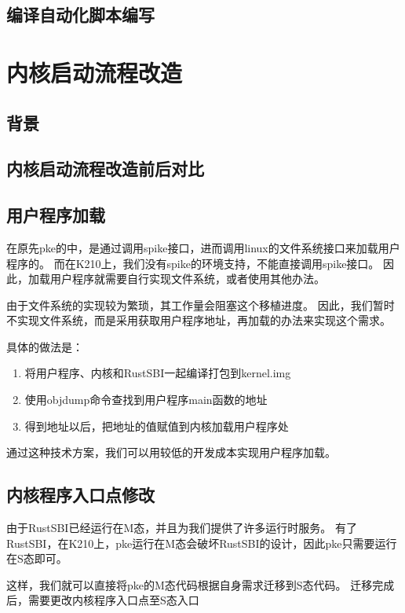 \subsection{编译自动化脚本编写}

\section{内核启动流程改造}

\subsection{背景}

\subsection{内核启动流程改造前后对比}

\subsection{用户程序加载}

在原先pke的中，是通过调用spike接口，进而调用linux的文件系统接口来加载用户程序的。
而在K210上，我们没有spike的环境支持，不能直接调用spike接口。
因此，加载用户程序就需要自行实现文件系统，或者使用其他办法。

由于文件系统的实现较为繁琐，其工作量会阻塞这个移植进度。
因此，我们暂时不实现文件系统，而是采用获取用户程序地址，再加载的办法来实现这个需求。

具体的做法是：

\begin{enumerate}
    \item 将用户程序、内核和RustSBI一起编译打包到kernel.img
    \item 使用objdump命令查找到用户程序main函数的地址
    \item 得到地址以后，把地址的值赋值到内核加载用户程序处
\end{enumerate}

通过这种技术方案，我们可以用较低的开发成本实现用户程序加载。

\subsection{内核程序入口点修改}

由于RustSBI已经运行在M态，并且为我们提供了许多运行时服务。
有了RustSBI，在K210上，pke运行在M态会破坏RustSBI的设计，因此pke只需要运行在S态即可。

这样，我们就可以直接将pke的M态代码根据自身需求迁移到S态代码。
迁移完成后，需要更改内核程序入口点至S态入口

